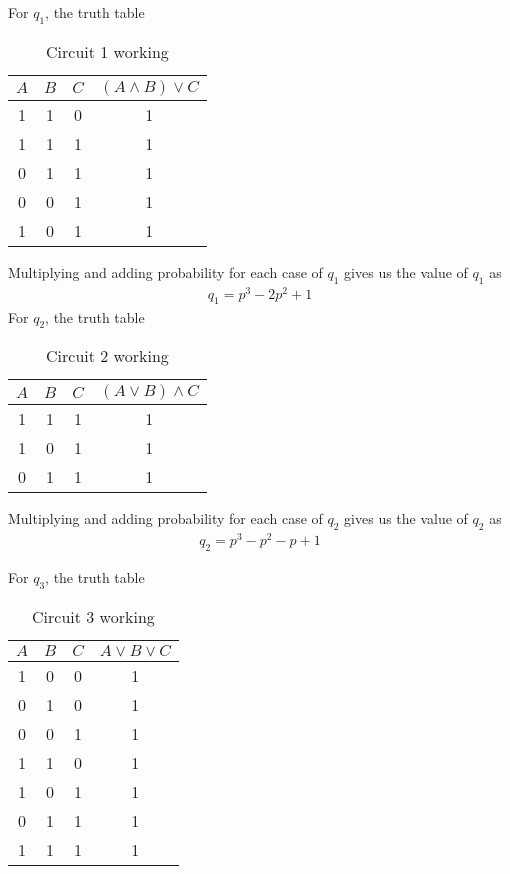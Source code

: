 \documentclass[journal,12pt,twocolumn]{IEEEtran}
\begin{document}
For $q_1$, the truth table\\

\begin{table}[h]
    \centering
    \begin{tabular}{|c|c|c|c|}
    \hline
         $A$ & $B$ & $C$ & $(A \land B) \lor C$ \\
         \hline
         1 &1  & 0 &1\\\hline
         1&1&1&1\\\hline
         0&1&1&1\\\hline
         0&0&1&1\\\hline
         1&0&1&1\\
    \hline
    \end{tabular}
    \caption{Circuit 1 working}
    \label{tab:my_label}
\end{table}

Multiplying and adding probability for each case of $q_1$ gives us the value of $q_1$ as
\begin{align}
    q_1 = p^3-2p^2+1
\end{align}
For $q_2$, the truth table
\begin{table}[h]
    \centering

    \begin{tabular}{|c|c|c|c|}
    \hline
         $A$ & $B$ & $C$ & $(A \lor B) \land C$ \\
         \hline
         1&1&1&1\\ \hline
         1&0&1&1\\\hline
         0&1&1&1\\
    \hline
    \end{tabular}
    \caption{Circuit 2 working}
    \label{tab:table2}
\end{table}

Multiplying and adding probability for each case of $q_2$ gives us the value of $q_2$ as
\begin{align}
    q_2 = p^3-p^2-p+1
\end{align}

For $q_3$, the truth table
\begin{table}[h]
    \centering
    \begin{tabular}{|c|c|c|c|}
    \hline
         $A$ & $B$ & $C$ & $A \lor B \lor C$ \\
         \hline
         1&0&0&1\\\hline
         0&1&0&1\\\hline
         0&0&1&1\\\hline
         1&1&0&1\\\hline
         1&0&1&1\\\hline
         0&1&1&1\\\hline
         1&1&1&1\\
    \hline
    \end{tabular}
    \caption{Circuit 3 working}
    \label{tab:table3}
\end{table}
\end{document}
